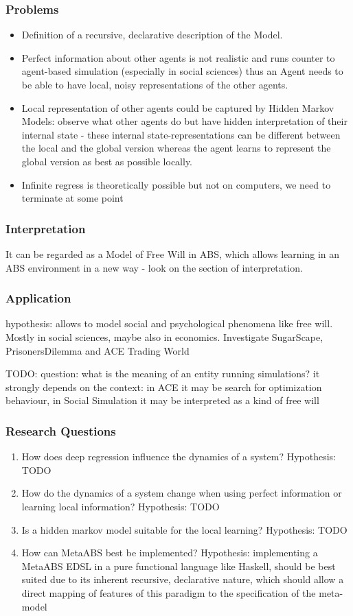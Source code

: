 \subsubsection{Problems} 
\begin{itemize}
	\item Definition of a recursive, declarative description of the Model.
	\item Perfect information about other agents is not realistic and runs counter to agent-based simulation (especially in social sciences) thus an Agent needs to be able to have local, noisy representations of the other agents.
	\item Local representation of other agents could be captured by Hidden Markov Models: observe what other agents do but have hidden interpretation of their internal state - these internal state-representations can be different between the local and the global version whereas the agent learns to represent the global version as best as possible locally.
	\item Infinite regress is theoretically possible but not on computers, we need to terminate at some point
\end{itemize}

\subsubsection{Interpretation} It can be regarded as a Model of Free Will in ABS, which allows learning in an ABS environment in a new way - look on the section of interpretation.
\subsubsection{Application} hypothesis: allows to model social and psychological phenomena like free will. Mostly in social sciences, maybe also in economics. Investigate SugarScape, PrisonersDilemma and ACE Trading World

TODO: question: what is the meaning of an entity running simulations? it strongly depends on the context: in ACE it may be search for optimization behaviour, in Social Simulation it may be interpreted as a kind of free will

\subsubsection{Research Questions} 
\begin{enumerate}
	\item How does deep regression influence the dynamics of a system? Hypothesis: TODO
	\item How do the dynamics of a system change when using perfect information or learning local information? Hypothesis: TODO
	\item Is a hidden markov model suitable for the local learning? Hypothesis: TODO
	\item How can MetaABS best be implemented? Hypothesis: implementing a MetaABS EDSL in a pure functional language like Haskell, should be best suited due to its inherent recursive, declarative nature, which should allow a direct mapping of features of this paradigm to the specification of the meta-model
\end{enumerate}

